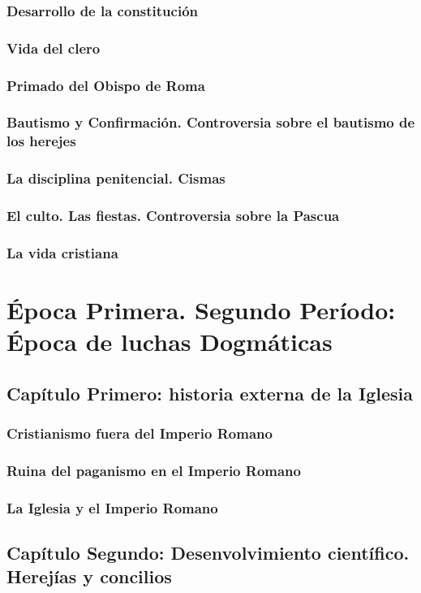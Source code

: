 \raggedbottom{} \documentclass[12pt, a4paper]{book}
\begin{document}
\section{Desarrollo de la constitución}
\section{Vida del clero}
\section{Primado del Obispo de Roma}
\section{Bautismo y Confirmación. Controversia sobre el bautismo de los herejes}
\section{La disciplina penitencial. Cismas}
\section{El culto. Las fiestas. Controversia sobre la Pascua}
\section{La vida cristiana}
\part{Época Primera. Segundo Período: Época de luchas Dogmáticas}
\chapter{Capítulo Primero: historia externa de la Iglesia}
\section{Cristianismo fuera del Imperio Romano}
\section{Ruina del paganismo en el Imperio Romano}
\section{La Iglesia y el Imperio Romano}
\chapter{Capítulo Segundo: Desenvolvimiento científico. Herejías y concilios}
\end{document}
